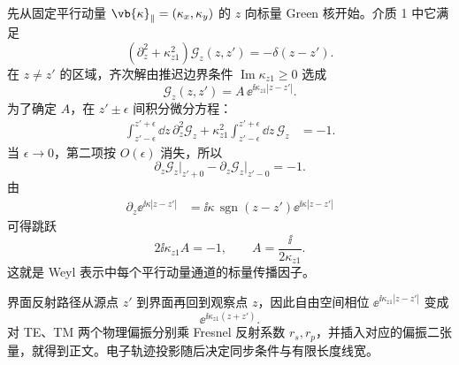 \begin{derivation}[平面界面的混合表象与单位长度损失]
先从固定平行动量 $\vb{\kappa}_\parallel=(\kappa_x,\kappa_y)$ 的 $z$ 向标量 Green 核开始。介质 1 中它满足
\begin{equation*}
 (\partial_z^2+\kappa_{z1}^2)\mathscr G_z(z,z')
 =-\delta(z-z').
\end{equation*}
在 $z\neq z'$ 的区域，齐次解由推迟边界条件 $\operatorname{Im}\kappa_{z1}\ge0$ 选成
\begin{equation*}
 \mathscr G_z(z,z')
 =A\,\ee^{\ii\kappa_{z1}|z-z'|}.
\end{equation*}
为了确定 $A$，在 $z'\pm\epsilon$ 间积分微分方程：
\begin{align*}
 \int_{z'-\epsilon}^{z'+\epsilon}\dd z\,
 \partial_z^2\mathscr G_z
 +\kappa_{z1}^2
 \int_{z'-\epsilon}^{z'+\epsilon}\dd z\,\mathscr G_z
 &=-1.
\end{align*}
当 $\epsilon\to0$，第二项按 $O(\epsilon)$ 消失，所以
\begin{equation*}
 \partial_z\mathscr G_z\big|_{z'+0}
 -\partial_z\mathscr G_z\big|_{z'-0}=-1.
\end{equation*}
由
\begin{align*}
 \partial_z \ee^{\ii\kappa|z-z'|}
 &=\ii\kappa\,\operatorname{sgn}(z-z')
 \ee^{\ii\kappa|z-z'|}
\end{align*}
可得跳跃
\begin{equation*}
 2\ii\kappa_{z1}A=-1,
 \qquad
 A=\frac{\ii}{2\kappa_{z1}}.
\end{equation*}
这就是 Weyl 表示中每个平行动量通道的标量传播因子。

界面反射路径从源点 $z'$ 到界面再回到观察点 $z$，因此自由空间相位 $\ee^{\ii\kappa_{z1}|z-z'|}$ 变成
\begin{equation*}
 \ee^{\ii\kappa_{z1}(z+z')}.
\end{equation*}
对 TE、TM 两个物理偏振分别乘 Fresnel 反射系数 $r_s,r_p$，并插入对应的偏振二张量，就得到正文。电子轨迹投影随后决定同步条件与有限长度线宽。


\end{derivation}

